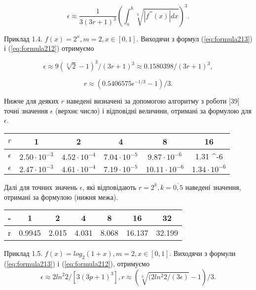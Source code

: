 \documentclass[ukrainian,14pt]{extarticle}
\begin{document}
\begin{equation}\label{eq:formula213}
    \epsilon \approx \frac{1}{3(3r + 1)^3} \left( \int_a^b \sqrt[3]{|f^{'''}(x)| dx} \right)^3.
\end{equation}

Приклад 1.4. $f(x) = 2^x, m = 2, x \in [0,1].$ Виходячи з формул (\ref{eq:formula213}) і (\ref{eq:formula212}) отримуємо

$$\epsilon \approx 9(\sqrt[3]{2} - 1)^3 / (3r + 1)^3 \approx 0.1580398 / (3r + 1)^3,$$

$$r \approx (0.5406575 \epsilon^{-1/3} - 1) / 3.$$

Нижче для деяких $r$ наведені визначені за допомогою алгоритму з роботи [39] точні значення $\epsilon$ (верхнє число) і відповідні величини, отримані за формулою для $\epsilon$.

\bgroup
\def\arraystretch{1.5}
\begin{center}
\begin{tabular}{ c | c |
c | c | c | c}
 $r$ & 1 & 2 & 4 & 8 & 16 \\
 \hline
 $\epsilon$ & $2.50 \cdot 10^{-3}$ & $4.52 \cdot 10^{-4}$ & $7.04 \cdot 10^{-5}$ & $9.87 \cdot 10^{-6}$ & 1.31 \cdot 10^{-6} \\  
 \hline
  $\epsilon$ & $2.47 \cdot 10^{-3}$ & $4.61 \cdot 10^{-4}$ & $7.19 \cdot 10^{-5}$ & $10.11 \cdot 10^{-6}$ & $1.34 \cdot 10^{-6}$ \\  
\end{tabular}
\end{center}
\egroup

Далі для точних значень $\epsilon$, які відповідають $r = 2^k, k = \overline{0, 5}$ наведені значення, отримані за формулою (нижня межа).

\bgroup
\def\arraystretch{1.5}
\begin{center}
\begin{tabular}{ c | c |
c | c | c | c | c}
 - & 1 & 2 & 4 & 8 & 16 & 32 \\
 \hline
 r & 0.9945 & 2.015 & 4.031 & 8.068 & 16.137 & 32.199 \\  

\end{tabular}
\end{center}
\egroup

Приклад 1.5. $f(x) = log_2 (1+x), m = 2, x \in [0, 1].$ Виходячи з формули  (\ref{eq:formula213}) і (\ref{eq:formula212}), отримуємо
    $$\epsilon \approx 2 ln^2 2/[3(3p + 1)^3], r \approx (\sqrt[3]{(2 ln^2 2/ (3\epsilon)} - 1) /3.$$
    
\end{document}
